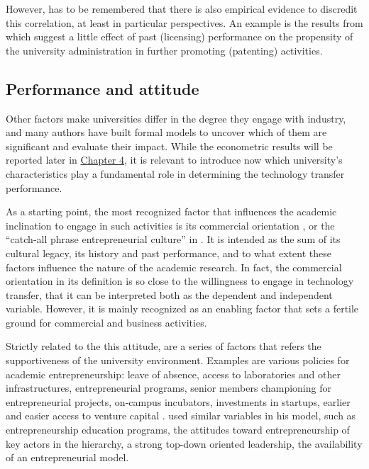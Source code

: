 However, has to be remembered that there is also empirical evidence to discredit this correlation, at least in particular perspectives. An example is the results from \citet{Thursby2002} which suggest a little effect of past (licensing) performance on the propensity of the university administration in further promoting (patenting) activities.


\subsection{Performance and attitude}

Other factors make universities differ in the degree they engage with industry, and many authors have built formal models to uncover which of them are significant and evaluate their impact. While the econometric results will be reported later in \hyperref[Chapter4]{Chapter 4}, it is relevant to introduce now which university's characteristics play a fundamental role in determining the technology transfer performance.

As a starting point, the most recognized factor that influences the academic inclination to engage in such activities is its commercial orientation \citep{DEste2007}, or the \enquote{catch-all phrase entrepreneurial culture} in \citet{OwenSmith2001}. It is intended as the sum of its cultural legacy, its history and past performance, and to what extent these factors influence the nature of the academic research. In fact, the commercial orientation in its definition is so close to the willingness to engage in technology transfer, that it can be interpreted both as the dependent and independent variable. However, it is mainly recognized as an enabling factor that sets a fertile ground for commercial and business activities. 

Strictly related to the this attitude, are a series of factors that refers the supportiveness of the university environment. Examples are various policies for academic entrepreneurship: leave of absence, access to laboratories and other infrastructures, entrepreneurial programs, senior members championing for entrepreneurial projects, on-campus incubators, investments in startups, earlier and easier access to venture capital \citep{Baldini2007}. \citet{Guerrero2014} used similar variables in his model, such as entrepreneurship education programs, the attitudes toward entrepreneurship of key actors in the hierarchy, a strong top-down oriented leadership, the availability of an entrepreneurial model.

